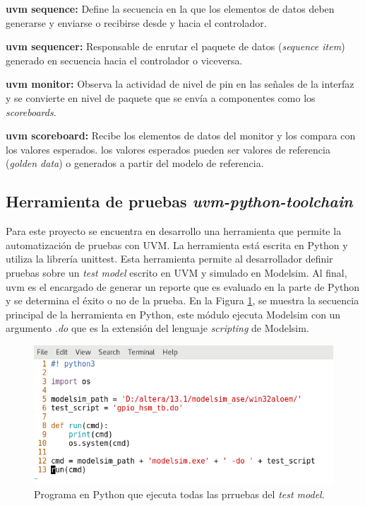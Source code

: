 \documentclass[a4paper]{article}
\begin{document}
\textbf{uvm sequence:} Define la secuencia en la que los elementos de datos deben generarse y enviarse o recibirse desde y hacia el controlador.

\textbf {uvm sequencer:} Responsable de enrutar el paquete de datos (\textit{sequence item}) generado en secuencia hacia el controlador o viceversa.

\textbf{uvm monitor:} Observa la actividad de nivel de pin en las señales de la interfaz y se convierte en nivel de paquete que se envía a componentes como los \textit{scoreboards}.

\textbf{uvm scoreboard:} Recibe los elementos de datos del monitor y los compara con los valores esperados.
los valores esperados pueden ser valores de referencia (\textit{golden data}) o generados a partir del modelo de referencia.


\subsection{Herramienta de pruebas \textit{uvm-python-toolchain}}

Para este proyecto se encuentra en desarrollo una herramienta que permite la automatización de pruebas con UVM. La herramienta está escrita en Python y utiliza la librería unittest. Esta herramienta permite al desarrollador definir pruebas sobre un \textit{test model} escrito en UVM y simulado en Modelsim. Al final, uvm es el encargado de generar un reporte que es evaluado en la parte de Python y se determina el éxito o no de la prueba. En la Figura \ref{fig:run_test}, se muestra la secuencia principal de la herramienta en Python, este módulo ejecuta Modelsim con un argumento \textit{.do} que es la extensión del lenguaje \textit{scripting} de Modelsim.

\begin{figure}[h]
  \centering  
  \includegraphics[width=0.8\linewidth]{pictures/python_test.png}
  \caption{Programa en Python que ejecuta todas las prruebas del \textit{test model}.}
  \label{fig:run_test}
\end{figure}
\end{document}
